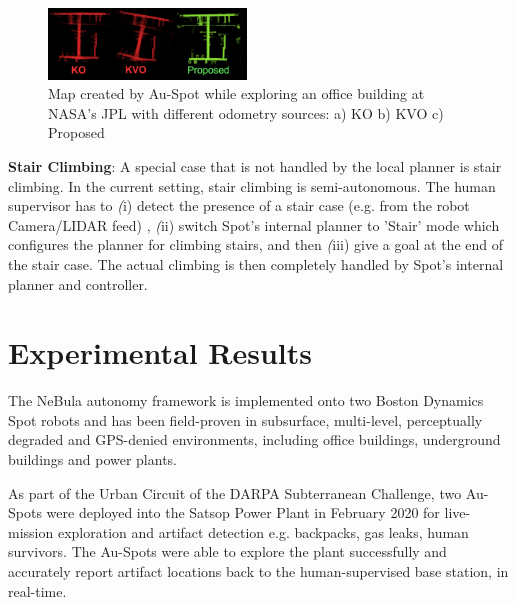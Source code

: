 \documentclass[letterpaper, 10pt, conference]{ieeeconf}      %
\newcommand{\ph}[1]{{\textbf{#1}:}} %
\newcommand{\todo}[1]{{\color{red} #1 }} %
\newcommand{\inst}[1]{{\color{orange} #1 }} %
\newcommand{\rev}[1]{{\color{blue} #1 }} %
\begin{document}
\begin{figure}[t!]
  \centering
  \includegraphics[width=0.47\textwidth]{spot_iros/graphics/spot_proposed_office.PNG}
  \caption{Map created by Au-Spot while exploring an office building at NASA's JPL with different odometry sources: a) KO b) KVO c) Proposed}
  \label{spot_indoor_office}
\end{figure}


\ph{Stair Climbing}
A special case that is not handled by the local planner is stair climbing. 
In the current setting, stair climbing is semi-autonomous. The human supervisor has to \rev {\textit(i)} detect the presence of a stair case \rev{(e.g. from the robot Camera/LIDAR feed)}, \rev {\textit(ii)} switch Spot's internal planner to 'Stair' mode which configures the planner for climbing stairs, and then \rev {\textit(iii)} give \rev{a goal} at the end of the stair case. The actual climbing is then completely handled by Spot's internal planner and controller.

\section{Experimental Results}\label{sec:experiments}

The NeBula autonomy framework is implemented onto two Boston Dynamics Spot robots and has been field-proven in subsurface, multi-level, perceptually degraded and GPS-denied environments, including office buildings, underground buildings and power plants.

As part of the Urban Circuit of the DARPA Subterranean Challenge, two Au-Spots were deployed into the Satsop Power Plant in February 2020 for live-mission exploration and artifact detection e.g. backpacks, gas leaks, human survivors. 
The Au-Spots were able to explore \rev{the plant successfully and accurately report artifact locations back to the human-supervised base station, in real-time.}

\end{document}
